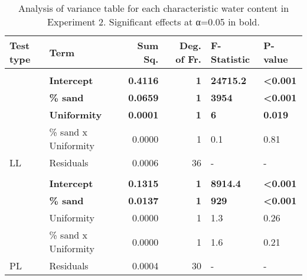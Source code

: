 \documentclass[
  letterpaper,
]{article}
\begin{document}
\begin{table}

\caption{\label{tab:uniformity-experiment-anova-table}Analysis of variance table for each characteristic water content in Experiment 2. Significant effects at α=0.05 in bold.}
\centering
\begin{tabular}[t]{llrrll}
\toprule
\textbf{Test type} & \textbf{Term} & \textbf{Sum Sq.} & \textbf{Deg. of Fr.} & \textbf{F-Statistic} & \textbf{P-value}\\
\midrule
\addlinespace[0.3em]
\multicolumn{6}{l}{\textbf{}}\\
\hline
\textbf{} & \textbf{Intercept} & \textbf{0.4116} & \textbf{1} & \textbf{24715.2} & \textbf{<0.001}\\
\cmidrule{2-6}
\textbf{} & \textbf{\% sand} & \textbf{0.0659} & \textbf{1} & \textbf{3954} & \textbf{<0.001}\\
\cmidrule{2-6}
\textbf{} & \textbf{Uniformity} & \textbf{0.0001} & \textbf{1} & \textbf{6} & \textbf{0.019}\\
\cmidrule{2-6}
 & \% sand x Uniformity & 0.0000 & 1 & 0.1 & 0.81\\
\cmidrule{2-6}
\multirow{-5}{*}{\raggedright\arraybackslash \hspace{1em}LL} & Residuals & 0.0006 & 36 & - & -\\
\cmidrule{1-6}
\addlinespace[0.3em]
\multicolumn{6}{l}{\textbf{}}\\
\hline
\textbf{} & \textbf{Intercept} & \textbf{0.1315} & \textbf{1} & \textbf{8914.4} & \textbf{<0.001}\\
\cmidrule{2-6}
\textbf{} & \textbf{\% sand} & \textbf{0.0137} & \textbf{1} & \textbf{929} & \textbf{<0.001}\\
\cmidrule{2-6}
 & Uniformity & 0.0000 & 1 & 1.3 & 0.26\\
\cmidrule{2-6}
 & \% sand x Uniformity & 0.0000 & 1 & 1.6 & 0.21\\
\cmidrule{2-6}
\multirow{-5}{*}{\raggedright\arraybackslash \hspace{1em}PL} & Residuals & 0.0004 & 30 & - & -\\
\bottomrule
\end{tabular}
\end{table}

\providecommand{\docline}[3]{\noalign{\global\setlength{\arrayrulewidth}{#1}}\arrayrulecolor[HTML]{#2}\cline{#3}}

\setlength{\tabcolsep}{2pt}

\renewcommand*{\arraystretch}{1.5}
\end{document}
